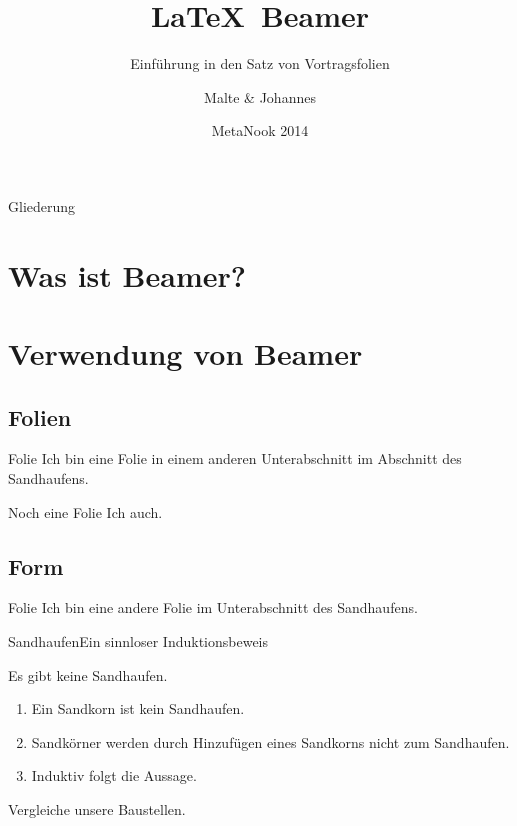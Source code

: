 \documentclass{beamer}
\title{\LaTeX\ Beamer}
\subtitle{Einführung in den Satz von Vortragsfolien}
\author{Malte \& Johannes}
\institute{Uni Lübeck}
\date{MetaNook 2014}
\begin{document}
  \begin{frame}[plain]
    \maketitle
  \end{frame}

  \begin{frame}{Gliederung}
    \tableofcontents
  \end{frame}

  \section{Was ist Beamer?}

  \section{Verwendung von Beamer}

  \subsection{Folien}

  \begin{frame}{Folie}
    Ich bin eine Folie in einem anderen Unterabschnitt im Abschnitt des Sandhaufens.
  \end{frame}

  \begin{frame}{Noch eine Folie}
    Ich auch.
  \end{frame}

  \subsection{Form}

  \begin{frame}{Folie}
    Ich bin eine andere Folie im Unterabschnitt des Sandhaufens.
  \end{frame}

  \begin{frame}{Sandhaufen}{Ein sinnloser Induktionsbeweis}
    \begin{Satz}[Sandhaufensatz]
      Es gibt keine Sandhaufen.
    \end{Satz}

    \begin{Beweis}
      \begin{enumerate}
        \item Ein Sandkorn ist kein Sandhaufen.
        \item Sandkörner werden durch Hinzufügen
          eines Sandkorns nicht zum Sandhaufen.
        \item Induktiv folgt die Aussage. \qedhere
      \end{enumerate}
    \end{Beweis}

    \begin{Beispiel}
      Vergleiche unsere Baustellen.
    \end{Beispiel}
  \end{frame}
\end{document}

